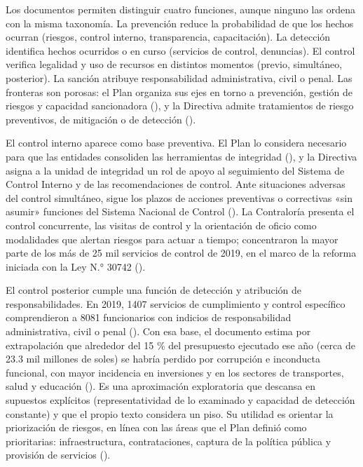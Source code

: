 \documentclass[Afour,sageh,times]{sagej}
\begin{document}
Los documentos permiten distinguir cuatro funciones, aunque ninguno las ordena con la misma taxonomía. La prevención reduce la probabilidad de que los hechos ocurran (riesgos, control interno, transparencia, capacitación). La detección identifica hechos ocurridos o en curso (servicios de control, denuncias). El control verifica legalidad y uso de recursos en distintos momentos (previo, simultáneo, posterior). La sanción atribuye responsabilidad administrativa, civil o penal. Las fronteras son porosas: el Plan organiza sus ejes en torno a prevención, gestión de riesgos y capacidad sancionadora (\citealp{pcm2018plan}), y la Directiva admite tratamientos de riesgo preventivos, de mitigación o de detección (\citealp{pcm2026directiva}).

El control interno aparece como base preventiva. El Plan lo considera necesario para que las entidades consoliden las herramientas de integridad (\citealp{pcm2018plan}), y la Directiva asigna a la unidad de integridad un rol de apoyo al seguimiento del Sistema de Control Interno y de las recomendaciones de control. Ante situaciones adversas del control simultáneo, sigue los plazos de acciones preventivas o correctivas «sin asumir» funciones del Sistema Nacional de Control (\citealp{pcm2026directiva}). La Contraloría presenta el control concurrente, las visitas de control y la orientación de oficio como modalidades que alertan riesgos para actuar a tiempo; concentraron la mayor parte de los más de 25 mil servicios de control de 2019, en el marco de la reforma iniciada con la Ley N.° 30742 (\citealp{contraloria2020corrupcion}).

El control posterior cumple una función de detección y atribución de responsabilidades. En 2019, 1407 servicios de cumplimiento y control específico comprendieron a 8081 funcionarios con indicios de responsabilidad administrativa, civil o penal (\citealp{contraloria2020corrupcion}). Con esa base, el documento estima por extrapolación que alrededor del 15 \% del presupuesto ejecutado ese año (cerca de 23.3 mil millones de soles) se habría perdido por corrupción e inconducta funcional, con mayor incidencia en inversiones y en los sectores de transportes, salud y educación (\citealp{contraloria2020corrupcion}). Es una aproximación exploratoria que descansa en supuestos explícitos (representatividad de lo examinado y capacidad de detección constante) y que el propio texto considera un piso. Su utilidad es orientar la priorización de riesgos, en línea con las áreas que el Plan definió como prioritarias: infraestructura, contrataciones, captura de la política pública y provisión de servicios (\citealp{pcm2018plan}).
\end{document}
